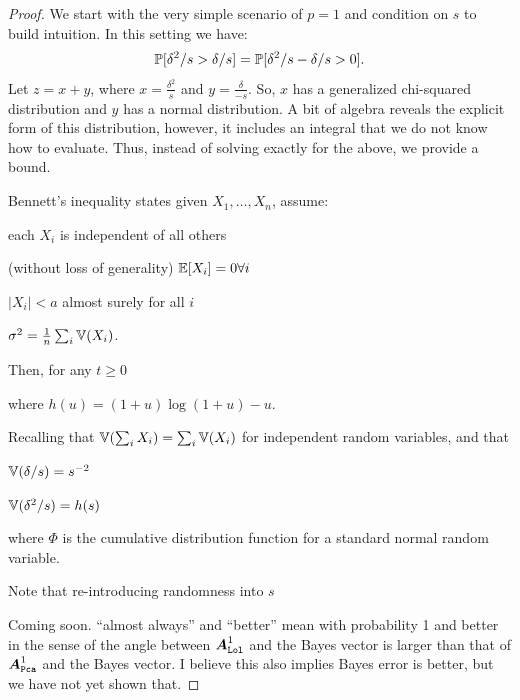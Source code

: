 \documentclass[10pt]{article}
\begin{document}
\begin{proof}
We start with the very simple scenario of $p=1$ and condition on $s$ to build intuition.
In this setting we have:
\begin{align}
\mathbb{P}[ \delta^2 / s > \delta/s ] = \mathbb{P}[ \delta^2 / s - \delta/s  > 0].
\end{align}
Let $z= x+y$, where $x= \frac{\delta^2}{s}$  and $y=\frac{\delta}{-s}$.
So, $x$ has a generalized chi-squared distribution and $y$ has a normal distribution.
A bit of algebra reveals the explicit form of this distribution, however, it includes an integral that we do not know how to evaluate.  Thus, instead of solving exactly for the above, we provide a bound.

Bennett's inequality states given $X_1,\ldots, X_n$, assume:
\begin{compactitem}
\item each $X_i$ is independent of all others
\item (without loss of generality) $\mathbb{E}[X_i]=0 \forall i$
\item $|X_i|<a$ almost surely for all $i$
\item $\sigma^2 = \frac{1}{n} \sum_i \mathbb{V}(X_i)$.
\end{compactitem}
Then, for any $t \geq 0$

where $h(u)=(1+u) \log (1+u) - u$.

Recalling that $\mathbb{V}(\sum_i X_i) = \sum_i \mathbb{V}(X_i)$ for independent random variables, and that
\begin{compactenum}
\item  $\mathbb{V}(\delta/s) = s^{-2}$
\item $\mathbb{V}(\delta^2/s) = h(s)$
\end{compactenum}





where $\Phi$ is the cumulative distribution function for a standard normal random variable.

Note that re-introducing randomness into $s$


Coming soon.  ``almost always'' and ``better'' mean with probability 1 and better in the sense of the angle between $\boldsymbol{A}_{{\sc \texttt{Lol}}}^1$ and the Bayes vector is larger than that of $\boldsymbol{A}_{{\sc \texttt{Pca}}}^1$ and the Bayes vector.
I believe this also implies Bayes error is better, but we have not yet shown that.
\end{proof}
\end{document}
